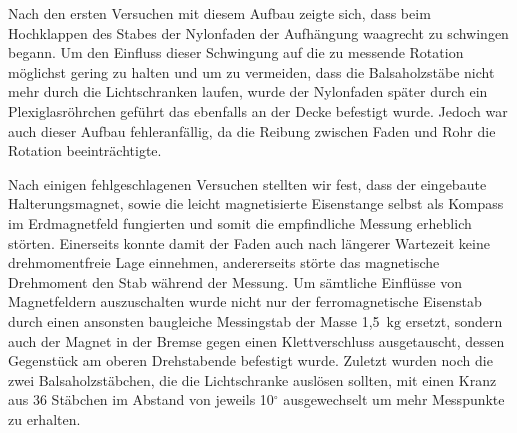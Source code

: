 \documentclass[11pt]{scrartcl}
\newcommand{\unit}[1]{\ensuremath{\,\mathrm{#1}}} %
\begin{document}
Nach den ersten Versuchen mit diesem Aufbau zeigte sich, dass beim Hochklappen des Stabes der Nylonfaden der Aufh\"angung waagrecht zu schwingen begann. Um den Einfluss dieser Schwingung auf die zu messende Rotation m\"oglichst gering zu halten und um zu vermeiden, dass die Balsaholzst\"abe nicht mehr durch die Lichtschranken laufen, wurde der Nylonfaden sp\"ater durch ein Plexiglasr\"ohrchen gef\"uhrt das ebenfalls an der Decke befestigt wurde. Jedoch war auch dieser Aufbau fehleranf\"allig, da die Reibung zwischen Faden und Rohr die Rotation beeintr\"achtigte.

Nach einigen fehlgeschlagenen Versuchen stellten wir fest, dass der eingebaute Halterungsmagnet, sowie die leicht magnetisierte Eisenstange selbst als Kompass im Erdmagnetfeld fungierten und somit die empfindliche Messung erheblich störten.
Einerseits konnte damit der Faden auch nach längerer Wartezeit keine drehmomentfreie Lage einnehmen, andererseits störte das magnetische Drehmoment den Stab während der Messung.
Um s\"amtliche Einfl\"usse von Magnetfeldern auszuschalten wurde nicht nur der ferromagnetische Eisenstab durch einen ansonsten baugleiche Messingstab der Masse 1,5 \unit{kg} ersetzt, sondern auch der Magnet in der Bremse gegen einen Klettverschluss ausgetauscht, dessen Gegenst\"uck am oberen Drehstabende befestigt wurde. Zuletzt wurden noch die zwei Balsaholzst\"abchen, die die Lichtschranke ausl\"osen sollten, mit einen Kranz aus 36 St\"abchen im Abstand von jeweils 10$^{\circ}$ ausgewechselt um mehr Messpunkte zu erhalten.

\end{document}
